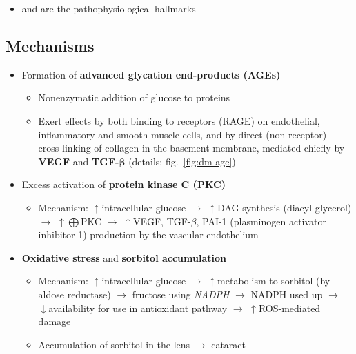 \documentclass[
  12pt,
]{memoir}
\providecommand{\tightlist}{%
  \setlength{\itemsep}{0pt}\setlength{\parskip}{0pt}}
\begin{document}
\begin{itemize}
\tightlist
\item
  \textbf{} and
  \textbf{} are the
  pathophysiological hallmarks
\end{itemize}

\hypertarget{mechanisms-1}{%
\subsection{Mechanisms}\label{mechanisms-1}}

\begin{itemize}
\tightlist
\item
  Formation of \textbf{advanced glycation end-products (AGEs)}

  \begin{itemize}
  \tightlist
  \item
    Nonenzymatic addition of glucose to proteins
  \item
    Exert effects by both binding to receptors (RAGE) on endothelial,
    inflammatory and smooth muscle cells, and by direct (non-receptor)
    cross-linking of collagen in the basement membrane, mediated chiefly
    by \textbf{VEGF} and \textbf{TGF-\(\boldsymbol\beta\)} (details:
    fig.~\ref{fig:dm-age})
  \end{itemize}
\item
  Excess activation of \textbf{protein kinase C (PKC)}

  \begin{itemize}
  \tightlist
  \item
    Mechanism: \(\uparrow\)intracellular glucose \(\rightarrow\)
    \(\uparrow\)DAG synthesis (diacyl glycerol) \(\rightarrow\)
    \(\uparrow\bigoplus\)PKC \(\rightarrow\) \(\uparrow\)VEGF,
    TGF-\(\beta\), PAI-1 (plasminogen activator inhibitor-1) production
    by the vascular endothelium
  \end{itemize}
\item
  \textbf{Oxidative stress} and \textbf{sorbitol accumulation}

  \begin{itemize}
  \tightlist
  \item
    Mechanism: \(\uparrow\)intracellular glucose \(\rightarrow\)
    \(\uparrow\)metabolism to sorbitol (by aldose reductase)
    \(\rightarrow\) fructose using \emph{NADPH} \(\rightarrow\) NADPH
    used up \(\rightarrow\) \(\downarrow\)availability for use in
    antioxidant pathway \(\rightarrow\) \(\uparrow\)ROS-mediated damage
  \item
    Accumulation of sorbitol in the lens \(\rightarrow\) cataract
  \end{itemize}
\end{itemize}
\end{document}
